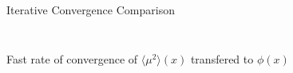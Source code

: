\documentclass[10pt]{beamer}
\newcommand{\edd}{\langle \mu^2 \rangle}
\begin{document}
\begin{frame}{Iterative Convergence Comparison}
\begin{columns}
		\begin{column}{.55\textwidth}
		\begin{figure}
			\centering
		\end{figure}
		\end{column}
		\hspace{-2em}
		\begin{column}{.55\textwidth}
		\begin{figure}
			\centering
		\end{figure}
		\end{column}
	\end{columns}

	\vspace{.2in}
	\begin{block}{}
	\centerline{Fast rate of convergence of $\edd(x)$ transfered to $\phi(x)$}
	\end{block}

\end{frame}
\end{document}

